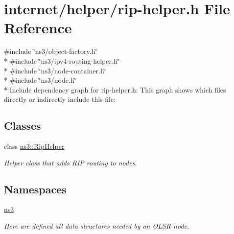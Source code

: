 \hypertarget{rip-helper_8h}{}\section{internet/helper/rip-\/helper.h File Reference}
\label{rip-helper_8h}
{\ttfamily \#include \char`\"{}ns3/object-\/factory.\+h\char`\"{}}\\*
{\ttfamily \#include \char`\"{}ns3/ipv4-\/routing-\/helper.\+h\char`\"{}}\\*
{\ttfamily \#include \char`\"{}ns3/node-\/container.\+h\char`\"{}}\\*
{\ttfamily \#include \char`\"{}ns3/node.\+h\char`\"{}}\\*
Include dependency graph for rip-\/helper.h\+:
This graph shows which files directly or indirectly include this file\+:
\subsection*{Classes}
\begin{DoxyCompactItemize}
\item 
class \hyperlink{classns3_1_1RipHelper}{ns3\+::\+Rip\+Helper}
\begin{DoxyCompactList}\small\item\em Helper class that adds R\+IP routing to nodes. \end{DoxyCompactList}\end{DoxyCompactItemize}
\subsection*{Namespaces}
\begin{DoxyCompactItemize}
\item 
 \hyperlink{namespacens3}{ns3}
\begin{DoxyCompactList}\small\item\em Here are defined all data structures needed by an O\+L\+SR node. \end{DoxyCompactList}\end{DoxyCompactItemize}
